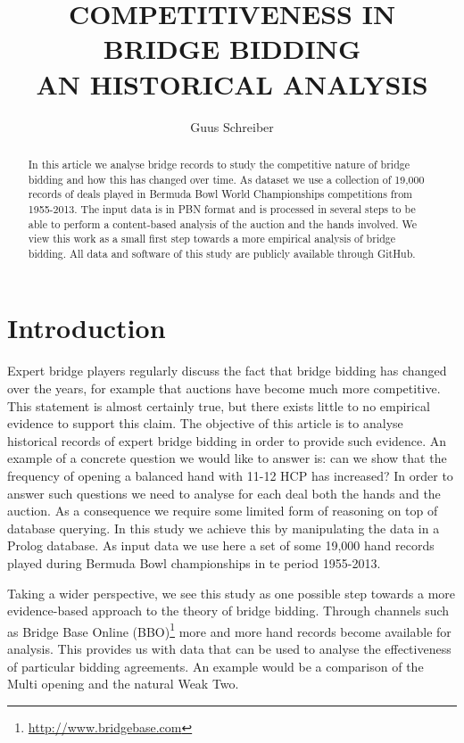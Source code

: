 \documentclass{icga}
\title{COMPETITIVENESS IN BRIDGE BIDDING \\ AN HISTORICAL ANALYSIS}
\author{Guus Schreiber}
\affiliation{VU University Amsterdam, Computer Science \\
                E-mail: \instance{guus.schreiber@vu.nl}}
\begin{document}
\maketitle

\begin{abstract}
  In this article we analyse bridge records to study the competitive
  nature of bridge bidding and how this has changed over time.  As
  dataset we use a collection of 19,000 records of deals played in
  Bermuda Bowl World Championships competitions from 1955-2013.  The
  input data is in PBN format and is processed in several steps to be
  able to perform a content-based analysis of the auction and the
  hands involved.  We view this work as a small first step towards a
  more empirical analysis of bridge bidding.  All data and software of
  this study are publicly available through GitHub.
\end{abstract}

\section{Introduction}

Expert bridge players regularly discuss the fact that bridge bidding
has changed over the years, for example that auctions have become much
more competitive. This statement is almost certainly true, but there
exists little to no empirical evidence to support this claim. The
objective of this article is to analyse historical records of expert
bridge bidding in order to provide such evidence. An example of a
concrete question we would like to answer is: can we show
that the frequency of opening a balanced hand with 11-12 HCP has
increased? In order to answer such questions we need to analyse for
each deal both the hands and the auction. As a consequence we require
some limited form of reasoning on top of database querying.  In this
study we achieve this by manipulating the data in a Prolog database.
As input data we use here a set of some 19,000 hand records played
during Bermuda Bowl championships in te period 1955-2013.

Taking a wider perspective, we see this study as one possible step
towards a more evidence-based approach to the theory of bridge
bidding. Through channels such as Bridge Base Online
(BBO)\footnote{\url{http://www.bridgebase.com}} more and more hand
records become available for analysis. This provides us with data that
can be used to analyse the effectiveness of particular bidding
agreements. An example would be a comparison of the Multi opening and
the natural Weak Two.
\end{document}
